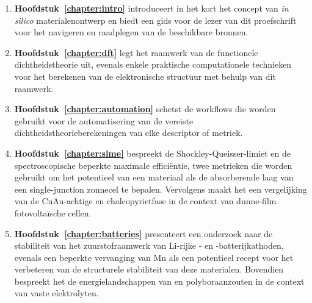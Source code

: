\begin{enumerate}[]

\vfill
\item \textbf{Hoofdstuk~\ref{chapter:intro}} introduceert in het kort het concept van \textit{in silico} materialenontwerp en biedt een gids voor de lezer van dit proefschrift voor het navigeren en raadplegen van de beschikbare bronnen.


\vfill
\item \textbf{Hoofdstuk~\ref{chapter:dft}} legt het raamwerk van de functionele dichtheidstheorie uit, evenals enkele praktische computationele technieken voor het berekenen van de elektronische structuur met behulp van dit raamwerk.

\vfill
\item \textbf{Hoofdstuk~\ref{chapter:automation}} schetst de workflows die worden gebruikt voor de automatisering van de vereiste dichtheidstheorieberekeningen van elke descriptor of metriek.

\vfill
\item \textbf{Hoofdstuk~\ref{chapter:slme}} bespreekt de Shockley-Queisser-limiet en de spectroscopische beperkte maximale efficiëntie, twee metrieken die worden gebruikt om het potentieel van een materiaal als de absorberende laag van een single-junction zonnecel te bepalen. Vervolgens maakt het een vergelijking van de CuAu-achtige en chalcopyrietfase in de context van dunne-film fotovoltaïsche cellen.

\vfill
\item \textbf{Hoofdstuk~\ref{chapter:batteries}} presenteert een onderzoek naar de stabiliteit van het zuurstofraamwerk van Li-rijke - en -batterijkathoden, evenals een beperkte vervanging van Mn als een potentieel recept voor het verbeteren van de structurele stabiliteit van deze materialen. Bovendien bespreekt het de energielandschappen van  en  polyboraanzouten in de context van vaste elektrolyten.

\end{enumerate}

\afterpage{\null\newpage}
